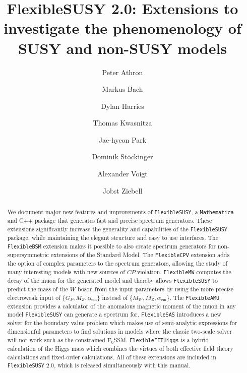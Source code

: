 \documentclass[final,3p,11pt,pdflatex]{elsarticle}
\makeatletter
\newcommand{\fs}{\texttt{FlexibleSUSY}\@\xspace}
\newcommand{\fstwo}{\fs 2.0\@\xspace}
\newcommand{\fbsm}{\texttt{FlexibleBSM}\@\xspace}
\newcommand{\fcpv}{\texttt{FlexibleCPV}\@\xspace}
\newcommand{\fmw}{\texttt{FlexibleMW}\@\xspace}
\newcommand{\famu}{\texttt{FlexibleAMU}\@\xspace}
\newcommand{\fsas}{\texttt{FlexibleSAS}\@\xspace}
\newcommand{\feft}{\texttt{Flex\-ib\-le\-EFT\-Higgs}\@\xspace}
\newcommand{\mathematica}{\texttt{Ma\-the\-ma\-ti\-ca}\xspace}
\newcommand{\CP}{\ensuremath{CP}\xspace}
\def\aem{\alpha_{\text{em}}}
\makeatother
\begin{document}
\begin{frontmatter}
 \vspace*{0.5cm}
 \title{\Large\bf FlexibleSUSY 2.0: Extensions to investigate the phenomenology of SUSY and non-SUSY models}

\author[Monash]{Peter Athron}
\author[dresden]{Markus Bach}
\author[adelaide,prague]{Dylan Harries}
\author[dresden]{Thomas Kwasnitza}
\author[kiasquc]{Jae-hyeon Park}
\author[dresden]{Dominik St\"ockinger}
\author[rwth]{Alexander Voigt}
\author[dresden]{Jobst Ziebell}
\address[Monash]{ARC Centre of Excellence for Particle Physics at
  the Terascale, School of Physics, Monash University, Melbourne,
  Victoria 3800, Australia}
\address[dresden]{Institut f\"ur Kern- und Teilchenphysik,
TU Dresden, Zellescher Weg 19, 01069 Dresden, Germany}
\address[adelaide]{ARC Centre of Excellence for Particle Physics at
the Terascale, Department of Physics, The University of Adelaide,
Adelaide, South Australia 5005, Australia}
\address[prague]{Institute of Particle and Nuclear Physics, Faculty of
  Mathematics and Physics, Charles University in Prague, V
  Hole\v{s}ovi\v{c}k\'{a}ch 2, 180 00 Praha 8, Czech Republic}
\address[kiasquc]{Quantum Universe Center,
Korea Institute for Advanced Study,
85 Hoegiro Dongdaemungu,
Seoul 02455, Republic of Korea}
\address[rwth]{Institute for Theoretical Particle Physics and Cosmology, RWTH Aachen University, 52074 Aachen, Germany}

  \begin{abstract}
    We document major new features and improvements
    of \fs, a \mathematica and
    C++ package that generates fast and precise spectrum
    generators. These extensions significantly increase the generality
    and capabilities of the \fs package, while maintaining the elegant
    structure and easy to use interfaces. The \fbsm extension makes it
    possible to also create spectrum generators for non-supersymmetric
    extensions of the Standard Model. The \fcpv extension adds the
    option of complex parameters to the spectrum generators, allowing
    the study of many interesting models with new sources of \CP
    violation. \fmw computes the decay of the muon for the generated
    model and thereby allows \fs to predict the mass of the $W$ boson
    from the input parameters by using the more precise electroweak
    input of $\{ G_F, M_Z, \aem \}$ instead of $\{ M_W, M_Z,
    \aem \}$. The \famu extension provides a calculator of the
    anomalous magnetic moment of the muon in any model \fs can
    generate a spectrum for.  \fsas introduces a new solver for the
    boundary value problem which makes use of semi-analytic expressions
    for dimensionful parameters to find solutions in models
    where the classic two-scale solver will not work such as the constrained
    E$_6$SSM\@. \feft is a hybrid calculation of the Higgs mass which
    combines the virtues of both effective field theory calculations
    and fixed-order calculations.  All of these extensions are
    included in \fstwo, which is released simultaneously with this
    manual.
  \end{abstract}


\end{frontmatter}
\end{document}

